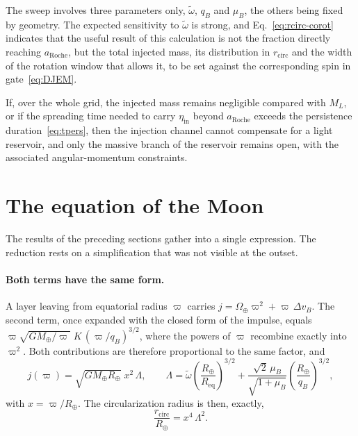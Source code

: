 \documentclass[11pt,a4paper,openany]{report}
\newcommand{\Mt}{M_{\oplus}}
\newcommand{\Rt}{R_{\oplus}}
\newcommand{\Req}{R_{\mathrm{eq}}}
\newcommand{\aR}{a_{\mathrm{Roche}}}
\begin{document}
\begin{controle}
The sweep involves three parameters only, $\tilde\omega$, $q_B$ and $\mu_B$, the others being fixed
by geometry. The expected sensitivity to $\tilde\omega$ is strong, and Eq.~\eqref{eq:rcirc-corot}
indicates that the useful result of this calculation is not the fraction directly reaching $\aR$,
but the total injected mass, its distribution in $r_{\mathrm{circ}}$ and the width of the rotation
window that allows it, to be set against the corresponding spin in gate~\eqref{eq:DJEM}.
\end{controle}

\begin{falsif}
If, over the whole grid, the injected mass remains negligible compared with $M_L$, or if the
spreading time needed to carry $\eta_{\mathrm{in}}$ beyond $\aR$ exceeds the persistence
duration~\eqref{eq:tpers}, then the injection channel cannot compensate for a light reservoir, and
only the massive branch of the reservoir remains open, with the associated angular-momentum
constraints.
\end{falsif}


\section{The equation of the Moon}
\label{sec:equation-lune}

The results of the preceding sections gather into a single expression. The reduction rests on a
simplification that was not visible at the outset.

\paragraph{Both terms have the same form.} A layer leaving from equatorial radius $\varpi$ carries
$j=\Omega_\oplus\varpi^2+\varpi\,\Delta v_B$. The second term, once expanded with the closed form
of the impulse, equals $\varpi\sqrt{G\Mt/\varpi}\;K\,(\varpi/q_B)^{3/2}$, where the powers of
$\varpi$ recombine exactly into $\varpi^{2}$. Both contributions are therefore proportional to the
same factor, and
\begin{equation}
j(\varpi)=\sqrt{G\Mt\Rt}\;x^{2}\,\Lambda,
\qquad
\Lambda=\tilde\omega\left(\frac{\Rt}{\Req}\right)^{3/2}
+\frac{\sqrt2\,\mu_B}{\sqrt{1+\mu_B}}\left(\frac{\Rt}{q_B}\right)^{3/2},
\label{eq:Lambda}
\end{equation}
with $x=\varpi/\Rt$. The circularization radius is then, exactly,
\begin{equation}
\frac{r_{\mathrm{circ}}}{\Rt}=x^{4}\,\Lambda^{2}.
\label{eq:rcirc-close}
\end{equation}
\end{document}
